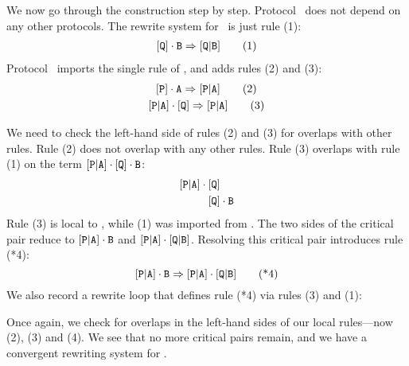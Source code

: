 \documentclass[../generics]{subfiles}
\begin{document}
\begin{example}
We now go through the construction step by step. Protocol \tQ\ does not depend on any other protocols. The rewrite system for \tQ\ is just rule (1):
\begin{gather*}
[\texttt{Q}]\cdot\texttt{B}\Rightarrow[\texttt{Q}|\texttt{B}]\tag{1}
\end{gather*}
Protocol \tP\ imports the single rule of \tQ, and adds rules (2) and (3):
\begin{gather*}
\AssocIntro{P}{A}\tag{2}\\
\ProtoConf{\aPA}{Q}\tag{3}
\end{gather*}

We need to check the left-hand side of rules (2) and (3) for overlaps with other rules. Rule (2) does not overlap with any other rules. Rule (3) overlaps with rule (1) on the term $[\texttt{P}|\texttt{A}]\cdot[\texttt{Q}]\cdot\texttt{B}$:
\begin{align*}
[\texttt{P}|\texttt{A}]\cdot{}&[\texttt{Q}]\\
&[\texttt{Q}]\cdot\texttt{B}
\end{align*}
Rule (3) is local to \tP, while (1) was imported from \tQ. The two sides of the critical pair reduce to $[\texttt{P}|\texttt{A}]\cdot\texttt{B}$ and $[\texttt{P}|\texttt{A}]\cdot[\texttt{Q}|\texttt{B}]$. Resolving this critical pair introduces rule (*4):
\[
[\texttt{P}|\texttt{A}]\cdot\texttt{B}\Rightarrow[\texttt{P}|\texttt{A}]\cdot[\texttt{Q}|\texttt{B}]\tag{*4}
\]
We also record a rewrite loop that defines rule (*4) via rules (3) and (1):
\begin{center}
\end{center}
Once again, we check for overlaps in the left-hand sides of our local rules---now (2), (3) and (4). We see that no more critical pairs remain, and we have a convergent rewriting system for \tP.


\end{example}
\end{document}
